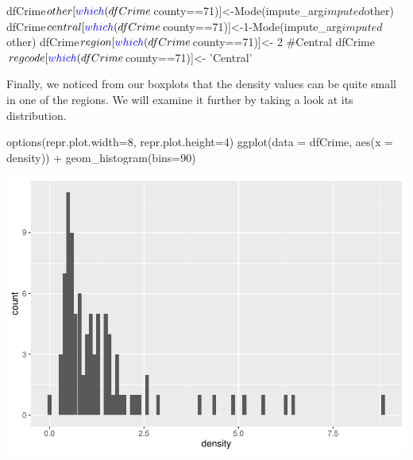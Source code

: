 \documentclass[]{article}
\newenvironment{Shaded}{}{}
\newcommand{\CommentTok}[1]{\textcolor[rgb]{0.00,0.50,0.00}{#1}}
\newcommand{\DataTypeTok}[1]{#1}
\newcommand{\DecValTok}[1]{#1}
\newcommand{\KeywordTok}[1]{\textcolor[rgb]{0.00,0.00,1.00}{#1}}
\newcommand{\NormalTok}[1]{#1}
\newcommand{\OperatorTok}[1]{#1}
\newcommand{\StringTok}[1]{\textcolor[rgb]{0.00,0.50,0.50}{#1}}
\begin{document}
\begin{Shaded}
\begin{Highlighting}[]
\NormalTok{dfCrime}\OperatorTok{$}\NormalTok{other[}\KeywordTok{which}\NormalTok{(dfCrime}\OperatorTok{$}\NormalTok{county}\OperatorTok{==}\DecValTok{71}\NormalTok{)]<-}\KeywordTok{Mode}\NormalTok{(impute_arg}\OperatorTok{$}\NormalTok{imputed}\OperatorTok{$}\NormalTok{other)}
\NormalTok{dfCrime}\OperatorTok{$}\NormalTok{central[}\KeywordTok{which}\NormalTok{(dfCrime}\OperatorTok{$}\NormalTok{county}\OperatorTok{==}\DecValTok{71}\NormalTok{)]<-}\DecValTok{1}\OperatorTok{-}\KeywordTok{Mode}\NormalTok{(impute_arg}\OperatorTok{$}\NormalTok{imputed}\OperatorTok{$}\NormalTok{other)}
\NormalTok{dfCrime}\OperatorTok{$}\NormalTok{region[}\KeywordTok{which}\NormalTok{(dfCrime}\OperatorTok{$}\NormalTok{county}\OperatorTok{==}\DecValTok{71}\NormalTok{)]<-}\StringTok{ }\DecValTok{2} \CommentTok{#Central}
\NormalTok{dfCrime}\OperatorTok{$}\NormalTok{regcode[}\KeywordTok{which}\NormalTok{(dfCrime}\OperatorTok{$}\NormalTok{county}\OperatorTok{==}\DecValTok{71}\NormalTok{)]<-}\StringTok{ 'Central'}
\end{Highlighting}
\end{Shaded}

Finally, we noticed from our boxplots that the density values can be
quite small in one of the regions. We will examine it further by taking
a look at its distribution.

\begin{Shaded}
\begin{Highlighting}[]
\KeywordTok{options}\NormalTok{(}\DataTypeTok{repr.plot.width=}\DecValTok{8}\NormalTok{, }\DataTypeTok{repr.plot.height=}\DecValTok{4}\NormalTok{)}
\KeywordTok{ggplot}\NormalTok{(}\DataTypeTok{data =}\NormalTok{ dfCrime, }\KeywordTok{aes}\NormalTok{(}\DataTypeTok{x =}\NormalTok{ density)) }\OperatorTok{+}
\StringTok{      }\KeywordTok{geom_histogram}\NormalTok{(}\DataTypeTok{bins=}\DecValTok{90}\NormalTok{)}
\end{Highlighting}
\end{Shaded}

\includegraphics{Bagnard_Gaustad_Hartman_Leung_Lab_3_files/figure-latex/unnamed-chunk-37-1.pdf}
\end{document}

